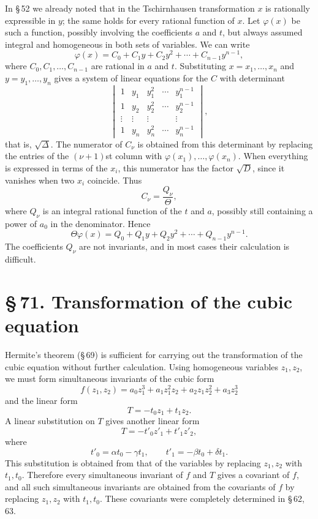 \documentclass[11pt]{article}
\providecommand{\sect}[2]{\section*{\S\,#1. #2}}
\begin{document}
In \S\,52 we already noted that in the Tschirnhausen transformation $x$ is rationally expressible in $y$; the same holds for every rational function of $x$. Let $\varphi(x)$ be such a function, possibly involving the coefficients $a$ and $t$, but always assumed integral and homogeneous in both sets of variables. We can write
\begin{equation}
 \varphi(x)=C_0+C_1y+C_2y^2+\cdots+C_{n-1}y^{n-1},
\tag{9}
\end{equation}
where $C_0,C_1,\ldots,C_{n-1}$ are rational in $a$ and $t$. Substituting $x=x_1,
\ldots,x_n$ and $y=y_1,\ldots,y_n$ gives a system of linear equations for the $C$ with determinant
\begin{equation}
\begin{vmatrix}
1&y_1&y_1^2&\cdots&y_1^{n-1}\\
1&y_2&y_2^2&\cdots&y_2^{n-1}\\
\vdots&\vdots&\vdots&&\vdots\\
1&y_n&y_n^2&\cdots&y_n^{n-1}
\end{vmatrix},
\tag{10}
\end{equation}
that is, $\sqrt{\Delta}$. The numerator of $C_\nu$ is obtained from this determinant by replacing the entries of the $(\nu+1)$st column with $\varphi(x_1),\ldots,\varphi(x_n)$. When everything is expressed in terms of the $x_i$, this numerator has the factor $\sqrt D$, since it vanishes when two $x_i$ coincide. Thus
\[
 C_\nu=\frac{Q_\nu}{\Theta},
\]
where $Q_\nu$ is an integral rational function of the $t$ and $a$, possibly still containing a power of $a_0$ in the denominator. Hence
\begin{equation}
 \Theta\varphi(x)=Q_0+Q_1y+Q_2y^2+\cdots+Q_{n-1}y^{n-1}.
\tag{11}
\end{equation}
The coefficients $Q_\nu$ are not invariants, and in most cases their calculation is difficult.

\sect{71}{Transformation of the cubic equation}

Hermite's theorem (\S\,69) is sufficient for carrying out the transformation of the cubic equation without further calculation. Using homogeneous variables $z_1,z_2$, we must form simultaneous invariants of the cubic form
\begin{equation}
 f(z_1,z_2)=a_0z_1^3+a_1z_1^2z_2+a_2z_1z_2^2+a_3z_2^3
\tag{1}
\end{equation}
and the linear form
\begin{equation}
 T=-t_0z_1+t_1z_2.
\tag{2}
\end{equation}
A linear substitution on $T$ gives another linear form
\[
 T=-t'_0z'_1+t'_1z'_2,
\]
where
\begin{equation}
 t'_0=\alpha t_0-\gamma t_1,
 \qquad
 t'_1=-\beta t_0+\delta t_1.
\tag{3}
\end{equation}
This substitution is obtained from that of the variables by replacing $z_1,z_2$ with $t_1,t_0$. Therefore every simultaneous invariant of $f$ and $T$ gives a covariant of $f$, and all such simultaneous invariants are obtained from the covariants of $f$ by replacing $z_1,z_2$ with $t_1,t_0$. These covariants were completely determined in \S\,62, 63.
\end{document}
